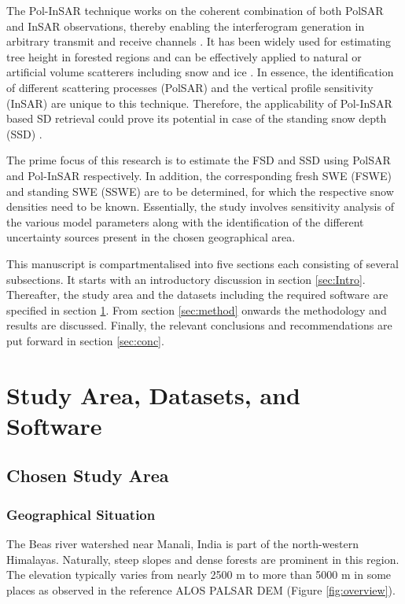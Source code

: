 \documentclass[review]{elsarticle}
\numberwithin{equation}{section}
\numberwithin{figure}{section}
\numberwithin{table}{section}
\begin{document}
The Pol-InSAR technique works on the coherent combination of both PolSAR and InSAR observations, thereby enabling the interferogram generation in arbitrary transmit and receive channels \citep{Cloude1998, Cloude2005, Cloude2010}. It has been widely used for estimating tree height in forested regions and can be effectively applied to natural or artificial volume scatterers including snow and ice \citep{Hajnsek2009, Kugler2015, Kumar2017, Papathanassiou2001}. In essence, the identification of different scattering processes (PolSAR) and the vertical profile sensitivity (InSAR) are unique to this technique. Therefore, the applicability of Pol-InSAR based SD retrieval could prove its potential in case of the standing snow depth (SSD) \citep{Negi2009, Thakur2012, Thakur2017}.

The prime focus of this research is to estimate the FSD and SSD using PolSAR and Pol-InSAR respectively. In addition, the corresponding fresh SWE (FSWE) and standing SWE (SSWE) are to be determined, for which the respective snow densities need to be known. Essentially, the study involves sensitivity analysis of the various model parameters along with the identification of the different uncertainty sources present in the chosen geographical area. 

This manuscript is compartmentalised into five sections each consisting of several subsections. It starts with an introductory discussion in section \ref{sec:Intro}. Thereafter, the study area and the datasets including the required  software are specified in section \ref{sec:study}. From section \ref{sec:method} onwards the methodology and results are discussed. Finally, the relevant conclusions and recommendations are put forward in section \ref{sec:conc}.

\section{Study Area, Datasets, and Software}
\label{sec:study}

\subsection{Chosen Study Area}
\subsubsection{Geographical Situation}
\label{sssec:geo}
The Beas river watershed near Manali, India is part of the north-western Himalayas. Naturally, steep slopes and dense forests are prominent in this region. The elevation typically varies from nearly 2500 m to more than 5000 m in some places as observed in the reference ALOS PALSAR DEM (Figure \ref{fig:overview}). 
\end{document}
